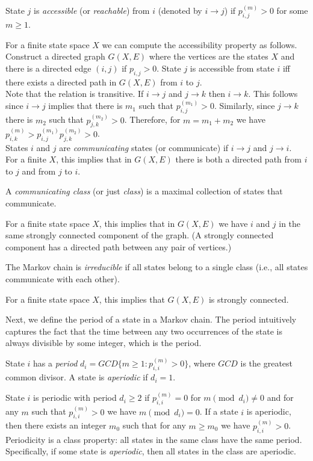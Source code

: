 \begin{definition}
    State $j$ is \emph{accessible} (or \emph{reachable}) from $i$  (denoted by $i \to j$) if $p_{i,j}^{(m)} > 0$ for some $m \ge
1$.
\end{definition}
For a finite state space $X$  we can compute the accessibility property as
follows. Construct a directed graph $G(X,E)$ where the vertices are
the states $X$ and there is a directed edge $(i,j)$ if $p_{i,j}>0$.
State $j$ is accessible from state $i$ iff there exists a directed
path in $G(X,E)$ from $i$ to $j$.\\
Note that the relation is transitive. If $i \to j$ and $j \to k$ then $i \to k$. This follows since $i \to j$ implies that there is $m_1$ such that  $p_{i,j}^{(m_1)} > 0$. Similarly, since $j \to k$ there is $m_2$ such that  $p_{j,k}^{(m_2)} > 0$. Therefore, for $m=m_1+m_2$ we have $p_{i,k}^{(m)} > p_{i,j}^{(m_1)}p_{j,k}^{(m_2)}>0$.\\
States $i$ and $j$ are \textit{communicating} states (or communicate) if $i \to j$ and $j \to
i$.\\
For a finite $X$, this implies that in $G(X,E)$ there is both a
directed path from $i$ to $j$ and from $j$ to $i$.
\begin{definition}
    A \emph{communicating class} (or just
\emph{class}) is a maximal collection of states that communicate.
\end{definition}
For a finite state space $X$, this implies that in $G(X,E)$ we have $i$ and $j$
in the same strongly connected component of the graph. (A strongly
connected component has a directed path between any pair of
vertices.)
\begin{definition}
    The Markov chain is
\emph{irreducible} if all states belong to a single class (i.e.,
all states communicate with each other).
\end{definition}
For a finite state space $X$, this implies that $G(X,E)$ is strongly
connected.

Next, we define the period of a state in a Markov chain. The period intuitively captures the fact that the time between any two occurrences of the state is always divisible by some integer, which is the period.
\begin{definition}
    State $i$ has a \emph{period} $d_i=GCD \{m\geq
1:p_{i,i}^{(m)}>0\}$, where $GCD$ is the greatest common divisor. A
state is \emph{aperiodic} if $d_i=1$.
\end{definition}
State $i$ is periodic with period $d_i \ge 2$ if  $p_{i,i}^{(m)} =
0$ for $m \pmod {d_i} \neq 0$ and for any $m$ such that
$p_{i,i}^{(m)} > 0$ we have $m \pmod {d_i} =0$.
If a state $i$ is aperiodic, then there exists an integer $m_0$ such
that for any $m\geq m_0$ we have $p_{i,i}^{(m)}>0$.
Periodicity is a class property: all states in the same class
have the same period. Specifically, if some state is
\emph{aperiodic},
then all states in the class are aperiodic.


